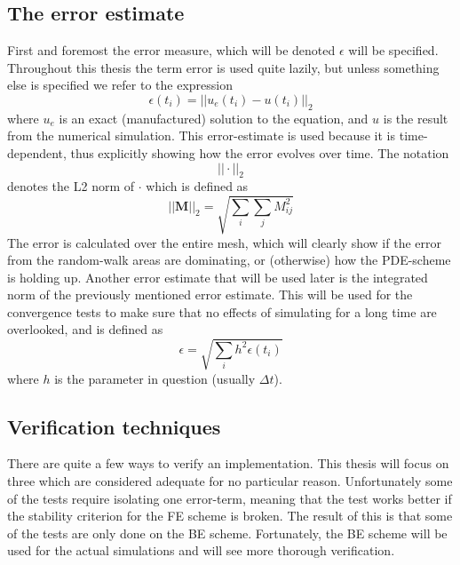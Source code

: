 \subsection{The error estimate}\label{error_estimate}
First and foremost the error measure, which will be denoted $\epsilon$ will be specified.
Throughout this thesis the term error is used quite lazily, but unless something else is specified we refer to the expression 
\begin{equation}
 \epsilon(t_i) = ||u_e(t_i)-u(t_i)||_2
\end{equation}
where $u_e$ is an exact (manufactured) solution to the equation, and $u$ is the result from the numerical simulation. 
This error-estimate is used because it is time-dependent, thus explicitly showing how the error evolves over time. 
The notation 
$$
||\cdot||_2
$$
denotes the L2 norm of $\cdot$ which is defined as 
$$
||\mathbf M||_2 = \sqrt{\sum_i\sum_j M_{ij}^2}
$$
The error is calculated over the entire mesh, which will clearly show if the error from the random-walk areas are dominating, or (otherwise) how the PDE-scheme is holding up.
Another error estimate that will be used later is the integrated norm of the previously mentioned error estimate. 
This will be used for the convergence tests to make sure that no effects of simulating for a long time are overlooked, and is defined as 
\begin{equation}
 \epsilon = \sqrt{\sum\limits_i h^2\epsilon(t_i)}
\end{equation}
where $h$ is the parameter in question (usually $\Delta t$).

\subsection{Verification techniques}
There are quite a few ways to verify an implementation. This thesis will focus on three which are considered adequate for no particular reason. 
Unfortunately some of the tests require isolating one error-term, meaning that the test works better if the stability criterion for the FE scheme is broken. 
The result of this is that some of the tests are only done on the BE scheme. 
Fortunately, the BE scheme will be used for the actual simulations and will see more thorough verification.

